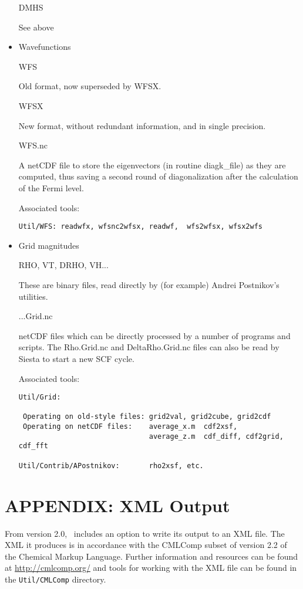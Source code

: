 \begin{itemize}
DMHS

See above

\item{Wavefunctions}

WFS

Old format, now superseded by WFSX.

WFSX

New format, without redundant information, and in single precision.

WFS.nc

A netCDF file to store the eigenvectors (in routine diagk\_file) as they
are computed, thus saving a second round of diagonalization after the
calculation of the Fermi level.

Associated tools:
\begin{verbatim}
Util/WFS: readwfx, wfsnc2wfsx, readwf,  wfs2wfsx, wfsx2wfs
\end{verbatim}

\item{Grid magnitudes}

RHO, VT, DRHO, VH...

These are binary files, read directly by (for example) Andrei
Postnikov's utilities.

...Grid.nc

netCDF files which can be directly processed by a number of programs
and scripts.  The Rho.Grid.nc and DeltaRho.Grid.nc files can also be
read by Siesta to start a new SCF cycle.

Associated tools:

\begin{verbatim}
Util/Grid:

 Operating on old-style files: grid2val, grid2cube, grid2cdf
 Operating on netCDF files:    average_x.m	cdf2xsf,
                               average_z.m  cdf_diff, cdf2grid, cdf_fft

Util/Contrib/APostnikov:       rho2xsf, etc.

\end{verbatim}
\end{itemize}

\newpage
\section{APPENDIX: XML Output}

From version 2.0, \siesta\ includes an option to write its output to an
XML file. The XML it produces is in accordance with the CMLComp subset of
version 2.2 of the Chemical Markup Language. Further information
and resources can be found at \url{http://cmlcomp.org/} and tools for working
with the XML file can be found in the \texttt{Util/CMLComp} directory.

